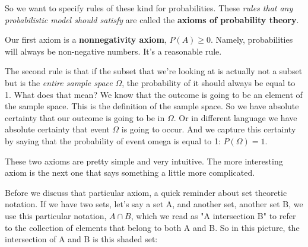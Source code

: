 \documentclass[pdftex, brazil, 12pt, twoside]{article}
\begin{document}
So we want to specify rules of these kind for probabilities.
These \emph{rules that any probabilistic model should
satisfy} are called the \textbf{axioms of probability theory}.

Our first axiom is a \textbf{nonnegativity axiom}, $P(A) \ge 0$.
Namely, probabilities will always be
non-negative numbers.
It's a reasonable rule.

The second rule is that if the subset that we're looking at
is actually not a subset but is the \emph{entire sample space}
$\Omega$, the probability of it should always be equal to 1.
What does that mean? We know that the outcome is going to be an element of the
sample space.
This is the definition of the sample space.
So we have absolute certainty that our outcome is going to
be in $\Omega$.
Or in different language we have absolute certainty that
event $\Omega$ is going to occur.
And we capture this certainty by saying that the probability
of event omega is equal to 1: $P(\Omega )= 1 $.

\begin{figure}[H]
  \begin{center}
  \end{center}
\end{figure}

These two axioms are pretty simple and very intuitive.
The more interesting axiom is the next one that says
something a little more complicated.

Before we discuss that particular axiom, a quick
reminder about set theoretic notation.
If we have two sets, let's say a set A, and another set,
another set B, we use this particular notation, $A \cap B$, which we
read as "A intersection B" to refer to the collection of
elements that belong to both A and B. So in this picture, the
intersection of A and B is this shaded set:

\begin{figure}[H]
  \begin{center}
  \end{center}
\end{figure}
\end{document}
